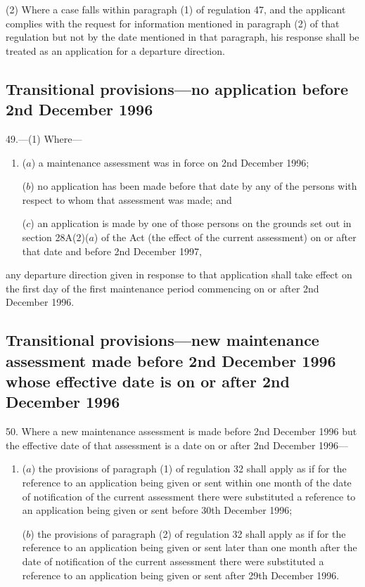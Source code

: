 \documentclass[12pt,a4paper]{article}
\begin{document}
(2) Where a case falls within paragraph (1) of regulation 47, and the applicant
complies with the request for information mentioned in paragraph (2) of that
regulation but not by the date mentioned in that paragraph, his response shall
be treated as an application for a departure direction.

\subsection[49. Transitional provisions—no application before 2nd December 1996]{Transitional provisions—no application before 2nd December 1996}

49.—(1) Where—
\begin{enumerate}\item[]
($a$) a maintenance assessment was in force on 2nd December 1996;

($b$) no application has been made before that date by any of the persons with
respect to whom that assessment was made; and

($c$) an application is made by one of those persons on the grounds set out in
section 28A(2)($a$) of the Act (the effect of the current assessment) on or after
that date and before 2nd December 1997,
\end{enumerate}
any departure direction given in response to that application shall take effect
on the first day of the first maintenance period commencing on or after 2nd
December 1996.

\subsection[50. Transitional provisions—new maintenance assessment made before 2nd December 1996 whose effective date is on or after 2nd December 1996]{\sloppy Transitional provisions—new maintenance assessment made before 2nd December 1996 whose effective date is on or after 2nd December 1996}

50. Where a new maintenance assessment is made before 2nd December 1996 but the effective date of that assessment is a date on or after 2nd December 1996—
\begin{enumerate}\item[]
($a$) the provisions of paragraph (1) of regulation 32 shall apply as if for the reference to an application being given or sent within 
one month  %
of the date of notification of the current assessment there were substituted a reference to an application being given or sent before 30th December 1996;

($b$) the provisions of paragraph (2) of regulation 32 shall apply as if for the reference to an application being given or sent later than 
one month  %
after the date of notification of the current assessment there were substituted a reference to an application being given or sent after 29th December 1996.
\end{enumerate}
\end{document}
